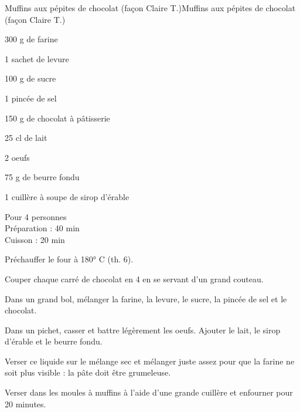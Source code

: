 \begin{recette}{Muffins aux pépites de chocolat (façon Claire T.)}{Muffins aux pépites de chocolat (façon Claire T.)}

\begin{ingredients}
300 g de farine\par
1 sachet de levure\par
100 g de sucre\par
1 pincée de sel\par
150 g de chocolat à pâtisserie\par
25 cl de lait\par
2 oeufs\par
75 g de beurre fondu\par
1 cuillère à soupe de sirop d'érable\par
\end{ingredients}

\begin{infos}
Pour 4 personnes\\
Préparation : 40 min\\
Cuisson : 20 min\\
\end{infos}

\begin{etapes}
\item Préchauffer le four à 180° C (th. 6).
\item Couper chaque carré de chocolat en 4 en se servant d'un grand couteau.
\item Dans un grand bol, mélanger la farine, la levure, le sucre, la pincée de sel et le chocolat.
\item Dans un pichet, casser et battre légèrement les oeufs. Ajouter le lait, le sirop d'érable et le beurre fondu.
\item Verser ce liquide sur le mélange sec et mélanger juste assez pour que la farine ne soit plus visible : la pâte doit être grumeleuse.
\item Verser dans les moules à muffins à l'aide d'une grande cuillère et enfourner pour 20 minutes.
\end{etapes}

\end{recette}